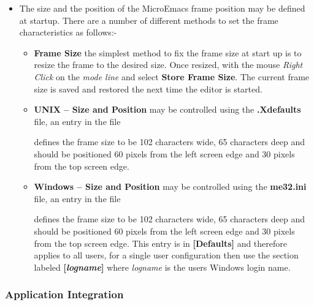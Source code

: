 \documentclass[11pt,a4paper,pdftex]{article}
\begin{document}
\begin{itemize}
    \item The size and the position of the MicroEmacs frame position may be
    defined at startup. There are a number of different methods to set the
    frame characteristics as follows:-

    \begin{itemize}

      \item \textbf{Frame Size} the simplest method to fix the frame size at
      start up is to resize the frame to the desired size. Once resized, with
      the mouse \textit{Right Click} on the \textit{mode line} and select
      \textbf{Store Frame Size}. The current frame size is saved and restored
      the next time the editor is started.

      \item \textbf{UNIX -- Size and Position} may be controlled using the
      \textbf{.Xdefaults} file, an entry in the file


      defines the frame size to be 102 characters wide, 65 characters deep and
      should be positioned 60 pixels from the left screen edge and 30 pixels
      from the top screen edge.

      \item \textbf{Windows -- Size and Position} may be controlled using the
      \textbf{me32.ini} file, an entry in the file


      defines the frame size to be 102 characters wide, 65 characters deep and
      should be positioned 60 pixels from the left screen edge and 30 pixels
      from the top screen edge. This entry is in \textbf{[Defaults]} and
      therefore applies to all users, for a single user configuration then use
      the section labeled \textbf{[\textit{logname}]} where \textit{logname}
      is the users Windows login name.

    \end{itemize}

  \end{itemize}

\subsubsection{Application Integration}
\end{document}
